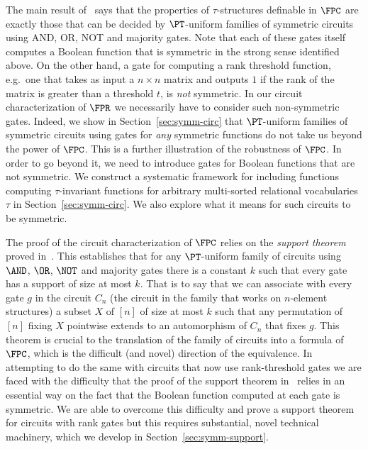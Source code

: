 \documentclass[a4paper,UKenglish]{lipics-v2018}
\begin{document}
The main result of~\cite{AndersonD17} says that the properties of
$\tau$-structures definable in $\FPC$ are exactly those that can be decided by
$\PT$-uniform families of symmetric circuits using AND, OR, NOT and majority
gates. Note that each of these gates itself computes a Boolean function that is
symmetric in the strong sense identified above. On the other hand, a gate for
computing a rank threshold function, e.g.\ one that takes as input a $n \times
n$ matrix and outputs $1$ if the rank of the matrix is greater than a threshold
$t$, is \emph{not} symmetric. In our circuit characterization of $\FPR$ we
necessarily have to consider such non-symmetric gates. Indeed, we show in
Section~\ref{sec:symm-circ} that $\PT$-uniform families of symmetric circuits
using gates for \emph{any} symmetric functions do not take us beyond the power
of $\FPC$. This is a further illustration of the robustness of $\FPC$. In order
to go beyond it, we need to introduce gates for Boolean functions that are not
symmetric. We construct a systematic framework for including functions computing
$\tau$-invariant functions for arbitrary multi-sorted relational vocabularies
$\tau$ in Section~\ref{sec:symm-circ}. We also explore what it means for such
circuits to be symmetric.

The proof of the circuit characterization of $\FPC$ relies on the \emph{support
  theorem} proved in~\cite{AndersonD17}. This establishes that for any
$\PT$-uniform family of circuits using $\AND$, $\OR$, $\NOT$ and majority gates
there is a constant $k$ such that every gate has a support of size at most $k$.
That is to say that we can associate with every gate $g$ in the circuit $C_n$
(the circuit in the family that works on $n$-element structures) a subset $X$ of
$[n]$ of size at most $k$ such that any permutation of $[n]$ fixing $X$
pointwise extends to an automorphism of $C_n$ that fixes $g$. This theorem is
crucial to the translation of the family of circuits into a formula of $\FPC$,
which is the difficult (and novel) direction of the equivalence. In attempting
to do the same with circuits that now use rank-threshold gates we are faced with
the difficulty that the proof of the support theorem in~\cite{AndersonD17}
relies in an essential way on the fact that the Boolean function computed at
each gate is symmetric. We are able to overcome this difficulty and prove a
support theorem for circuits with rank gates but this requires substantial,
novel technical machinery, which we develop in Section~\ref{sec:symm-support}.
\end{document}
